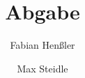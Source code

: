 \documentclass[10pt,twocolumn,letterpaper]{article}
\title{Abgabe \confName}
\author{Fabian Henßler
\and
Max Steidle
}
\begin{document}
\maketitle








{
    \small
    
    
}

\appendix


\end{document}
